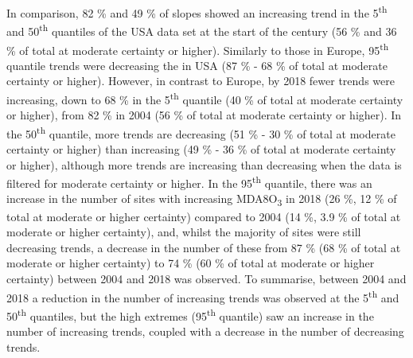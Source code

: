 \documentclass[journal abbreviation, manuscript]{copernicus}
\begin{document}
In comparison, 82 \%  and 49 \% of slopes showed an increasing trend in the 5\textsuperscript{th} and 50\textsuperscript{th} quantiles of the USA data set at the start of the century (56 \% and 36 \% of total at moderate certainty or higher). Similarly to those in Europe, 95\textsuperscript{th} quantile trends were decreasing the in USA (87 \% - 68 \% of total at moderate certainty or higher). However, in contrast to Europe, by 2018 fewer trends were increasing, down to 68 \% in the 5\textsuperscript{th} quantile (40 \% of total at moderate certainty or higher), from 82 \% in 2004 (56 \% of total at moderate certainty or higher). In the 50\textsuperscript{th} quantile, more trends are decreasing (51 \% - 30 \% of total at moderate certainty or higher) than increasing (49 \% - 36 \% of total at moderate certainty or higher), although more trends are increasing than decreasing when the data is filtered for moderate certainty or higher. In the 95\textsuperscript{th} quantile, there was an increase in the number of sites with increasing MDA8O\textsubscript{3} in 2018 (26 \%, 12 \% of total at moderate or higher certainty) compared to 2004 (14 \%, 3.9 \% of total at moderate or higher certainty), and, whilst the majority of sites were still decreasing trends, a decrease in the number of these from 87 \% (68 \% of total at moderate or higher certainty) to 74 \% (60 \% of total at moderate or higher certainty) between 2004 and 2018 was observed. To summarise, between 2004 and 2018 a reduction in the number of increasing trends was observed at the 5\textsuperscript{th} and 50\textsuperscript{th} quantiles, but the high extremes (95\textsuperscript{th} quantile) saw an increase in the number of increasing trends, coupled with a decrease in the number of decreasing trends.
\end{document}
